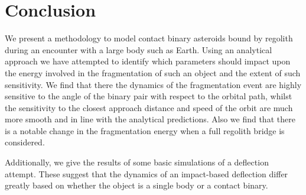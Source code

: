 \documentclass[letterpaper, preprint, paper,11pt]{AAS}	%
\begin{document}
\section{Conclusion}
We present a methodology to model contact binary asteroids bound by regolith during an encounter with a large body such as Earth. Using an analytical approach we have attempted to identify which parameters should impact upon the energy involved in the fragmentation of such an object and the extent of such sensitivity. We find that there the dynamics of the fragmentation event are highly sensitive to the angle of the binary pair with respect to the orbital path, whilst the sensitivity to the closest approach distance and speed of the orbit are much more smooth and in line with the analytical predictions. Also we find that there is a notable change in the fragmentation energy when a full regolith bridge is considered.

Additionally, we give the results of some basic simulations of a deflection attempt. These suggest that the dynamics of an impact-based deflection differ greatly based on whether the object is a single body or a contact binary. 


\end{document}
